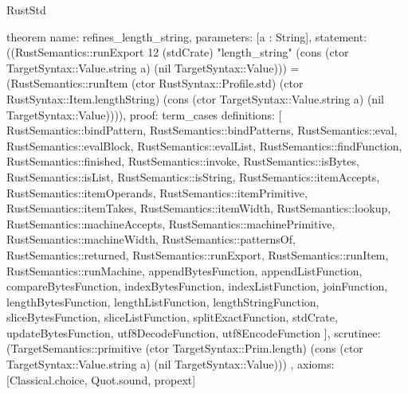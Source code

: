 \begin{lexlean}{RustStd}
\begin{semanticmodule}
theorem{
  name: refines_length_string,
  parameters: [a : String],
  statement: ((RustSemantics::runExport 12 (stdCrate) "length_string" (cons (ctor TargetSyntax::Value.string a) (nil TargetSyntax::Value))) = (RustSemantics::runItem (ctor RustSyntax::Profile.std) (ctor RustSyntax::Item.lengthString) (cons (ctor TargetSyntax::Value.string a) (nil TargetSyntax::Value)))),
  proof: term_cases{
    definitions: [
      RustSemantics::bindPattern,
      RustSemantics::bindPatterns,
      RustSemantics::eval,
      RustSemantics::evalBlock,
      RustSemantics::evalList,
      RustSemantics::findFunction,
      RustSemantics::finished,
      RustSemantics::invoke,
      RustSemantics::isBytes,
      RustSemantics::isList,
      RustSemantics::isString,
      RustSemantics::itemAccepts,
      RustSemantics::itemOperands,
      RustSemantics::itemPrimitive,
      RustSemantics::itemTakes,
      RustSemantics::itemWidth,
      RustSemantics::lookup,
      RustSemantics::machineAccepts,
      RustSemantics::machinePrimitive,
      RustSemantics::machineWidth,
      RustSemantics::patternsOf,
      RustSemantics::returned,
      RustSemantics::runExport,
      RustSemantics::runItem,
      RustSemantics::runMachine,
      appendBytesFunction,
      appendListFunction,
      compareBytesFunction,
      indexBytesFunction,
      indexListFunction,
      joinFunction,
      lengthBytesFunction,
      lengthListFunction,
      lengthStringFunction,
      sliceBytesFunction,
      sliceListFunction,
      splitExactFunction,
      stdCrate,
      updateBytesFunction,
      utf8DecodeFunction,
      utf8EncodeFunction
    ],
    scrutinee: (TargetSemantics::primitive (ctor TargetSyntax::Prim.length) (cons (ctor TargetSyntax::Value.string a) (nil TargetSyntax::Value)))
  },
  axioms: [Classical.choice, Quot.sound, propext]
}


\end{semanticmodule}
\end{lexlean}
